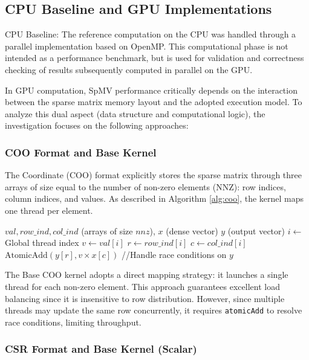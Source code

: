 \documentclass[conference]{IEEEtran}
\begin{document}
\subsection{CPU Baseline and GPU Implementations}

CPU Baseline: The reference computation on the CPU was handled through a parallel implementation based on OpenMP. This computational phase is not intended as a performance benchmark, but is used for validation and correctness checking of results subsequently computed in parallel on the GPU.


In GPU computation, SpMV performance critically depends on the interaction between the sparse matrix memory layout and the adopted execution model. To analyze this dual aspect (data structure and computational logic), the investigation focuses on the following approaches:


\subsubsection{COO Format and Base Kernel}

The Coordinate (COO) format explicitly stores the sparse matrix through three arrays of size equal to the number of non-zero elements (NNZ): row indices, column indices, and values. As described in Algorithm \ref{alg:coo}, the kernel maps one thread per element.


\begin{algorithm}[ht]
    \footnotesize
\caption{SpMV Kernel: COO Base (Atomic-based)}\label{alg:coo}
\begin{algorithmic}[1]
\REQUIRE $val, row\_ind, col\_ind$ (arrays of size $nnz$), $x$ (dense vector)
\ENSURE $y$ (output vector)
\STATE $i \gets$ Global thread index
\STATE $v \gets val[i]$
\STATE $r \gets row\_ind[i]$
\STATE $c \gets col\_ind[i]$
\STATE $\text{AtomicAdd}(y[r], v \times x[c])$  //Handle race conditions on $y$
\ENDIF
\end{algorithmic}
\end{algorithm}


The Base COO kernel adopts a direct mapping strategy: it launches a single thread for each non-zero element. This approach guarantees excellent load balancing since it is insensitive to row distribution. However, since multiple threads may update the same row concurrently, it requires \texttt{atomicAdd} to resolve race conditions, limiting throughput.


\subsubsection{CSR Format and Base Kernel (Scalar)}
\end{document}
